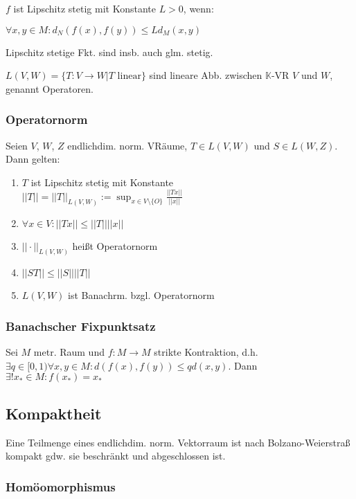$f$ ist Lipschitz stetig mit Konstante $L > 0$, wenn:

$\forall x, y \in M : d_N(f(x), f(y)) \leq L d_M(x, y)$

Lipschitz stetige Fkt. sind insb. auch glm. stetig.

$L(V, W) = \{T : V \rightarrow W | T \text{ linear} \}$ sind lineare Abb. zwischen $\mathbb{K}$-VR $V$ und $W$, genannt Operatoren.

\subsubsection*{Operatornorm}

Seien $V$, $W$, $Z$ endlichdim. norm. VRäume, $T \in L(V, W)$ und $S \in L(W, Z)$. Dann gelten:

\begin{enumerate}[label=(\alph*)]
	\item $T$ ist Lipschitz stetig mit Konstante \\ $||T|| = ||T||_{L(V, W)} := \sup_{x\in V \setminus \{O\}} \frac{||Tx||}{||x||}$
	\item $\forall x \in V : ||Tx|| \leq ||T|| ||x||$
	\item $||\cdot||_{L(V,W)}$ heißt Operatornorm
	\item $||ST|| \leq ||S|| ||T||$
	\item $L(V, W)$ ist Banachrm. bzgl. Operatornorm
\end{enumerate}

\subsubsection*{Banachscher Fixpunktsatz}

Sei $M$ metr. Raum und $f : M \rightarrow M$ strikte Kontraktion, d.h. $\exists q \in [0, 1) \forall x,y \in M : d(f(x), f(y)) \leq q d(x,y)$. Dann $\exists! x_* \in M : f(x_*) = x_*$

\subsection*{Kompaktheit}

Eine Teilmenge eines endlichdim. norm. Vektorraum ist nach Bolzano-Weierstraß kompakt gdw. sie beschränkt und abgeschlossen ist.

\subsubsection*{Homöomorphismus}

